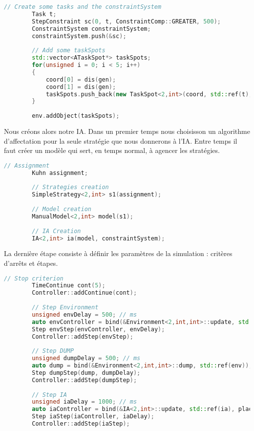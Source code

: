 \begin{lstlisting}[label=nvi_code,caption=Création des tâches / contraintes et emplacements,language=C++]        
        // Create some tasks and the constraintSystem
        Task t;
        StepConstraint sc(0, t, ConstraintComp::GREATER, 500);
        ConstraintSystem constraintSystem;
        constraintSystem.push(&sc);
        
        // Add some taskSpots
        std::vector<ATaskSpot*> taskSpots;
        for(unsigned i = 0; i < 5; i++)
        {
            coord[0] = dis(gen);
            coord[1] = dis(gen);
            taskSpots.push_back(new TaskSpot<2,int>(coord, std::ref(t), [](int& i, double _time){ return i+0.001*_time; }));
        }
        
        env.addObject(taskSpots);
\end{lstlisting}

Nous créons alors notre IA. Dans un premier temps nous choisisson un algorithme d'affectation pour la seule stratégie que nous donnerons à l'IA. Entre temps il faut créer un modèle qui sert, en temps normal, à agencer les stratégies.

\begin{lstlisting}[label=nvi_code,caption=Déclaration de l'IA,language=C++]         
        // Assignment
        Kuhn assignment;
        
        // Strategies creation
        SimpleStrategy<2,int> s1(assignment);
        
        // Model creation
        ManualModel<2,int> model(s1);
        
        // IA Creation
        IA<2,int> ia(model, constraintSystem);
\end{lstlisting}
 
La dernière étape consiste à définir les paramètres de la simulation : critères d'arrêts et étapes.
 
\begin{lstlisting}[label=nvi_code,caption=Paramètrage de la simulation,language=C++]         
        // Stop criterion
        TimeContinue cont(5);
        Controller::addContinue(cont);
        
        // Step Environment
        unsigned envDelay = 500; // ms
        auto envController = bind(&Environment<2,int,int>::update, std::ref(env), placeholders::_1);
        Step envStep(envController, envDelay);
        Controller::addStep(envStep);
        
        // Step DUMP
        unsigned dumpDelay = 500; // ms
        auto dump = bind(&Environment<2,int,int>::dump, std::ref(env));
        Step dumpStep(dump, dumpDelay);
        Controller::addStep(dumpStep);
        
        // Step IA
        unsigned iaDelay = 1000; // ms
        auto iaController = bind(&IA<2,int>::update, std::ref(ia), placeholders::_1);
        Step iaStep(iaController, iaDelay);
        Controller::addStep(iaStep);
\end{lstlisting}

